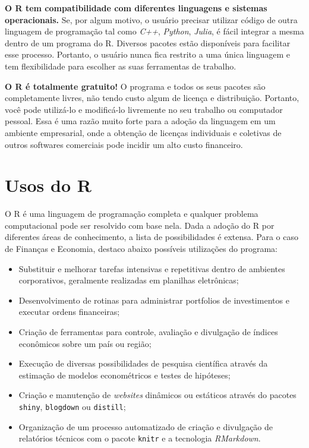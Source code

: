 \documentclass[
  11pt,
]{book}
\begin{document}
\textbf{O R tem compatibilidade com diferentes linguagens e sistemas operacionais.} Se, por algum motivo, o usuário precisar utilizar código de outra linguagem de programação tal como \emph{C++}, \emph{Python}, \emph{Julia}, é fácil integrar a mesma dentro de um programa do R. Diversos pacotes estão disponíveis para facilitar esse processo. Portanto, o usuário nunca fica restrito a uma única linguagem e tem flexibilidade para escolher as suas ferramentas de trabalho.

\textbf{O R é totalmente gratuito!} O programa e todos os seus pacotes são completamente livres, não tendo custo algum de licença e distribuição. Portanto, você pode utilizá-lo e modificá-lo livremente no seu trabalho ou computador pessoal. Essa é uma razão muito forte para a adoção da linguagem em um ambiente empresarial, onde a obtenção de licenças individuais e coletivas de outros softwares comerciais pode incidir um alto custo financeiro.

\hypertarget{usos-do-r}{%
\section{Usos do R}\label{usos-do-r}}

O R é uma linguagem de programação completa e qualquer problema computacional pode ser resolvido com base nela. Dada a adoção do R por diferentes áreas de conhecimento, a lista de possibilidades é extensa. Para o caso de Finanças e Economia, destaco abaixo possíveis utilizações do programa:

\begin{itemize}
\item
  Substituir e melhorar tarefas intensivas e repetitivas dentro de ambientes corporativos, geralmente realizadas em planilhas eletrônicas;
\item
  Desenvolvimento de rotinas para administrar portfolios de investimentos e executar ordens financeiras;
\item
  Criação de ferramentas para controle, avaliação e divulgação de índices econômicos sobre um país ou região;
\item
  Execução de diversas possibilidades de pesquisa científica através da estimação de modelos econométricos e testes de hipóteses;
\item
  Criação e manutenção de \emph{websites} dinâmicos ou estáticos através do pacotes \texttt{shiny}, \texttt{blogdown} ou \texttt{distill};
\item
  Organização de um processo automatizado de criação e divulgação de relatórios técnicos com o pacote \texttt{knitr} e a tecnologia \emph{RMarkdown}.
\end{itemize}
\end{document}
